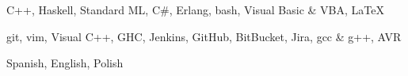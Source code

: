 
\begin{cvskills}

    {C++, Haskell, Standard ML, C\#, Erlang, bash, Visual Basic \& VBA, LaTeX} %

    {git, vim, Visual C++, GHC, Jenkins, GitHub, BitBucket, Jira, gcc \& g++, AVR} %

    {Spanish, English, Polish} %

\end{cvskills}
